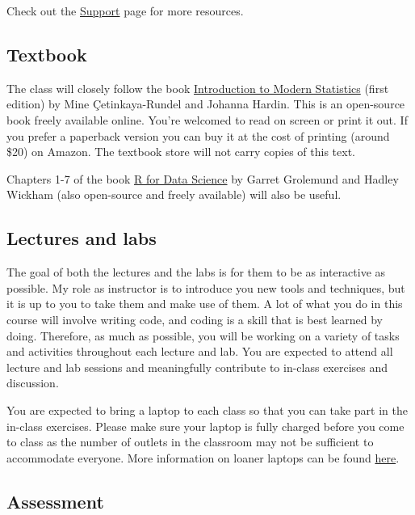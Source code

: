 \documentclass[
  letterpaper,
  DIV=11,
  numbers=noendperiod]{scrartcl}
\begin{document}
Check out the \href{/course-support.html}{Support} page for more
resources.

\hypertarget{textbook}{%
\subsection{Textbook}\label{textbook}}

The class will closely follow the book
\href{https://openintro-ims.netlify.app/}{Introduction to Modern
Statistics} (first edition) by Mine Çetinkaya-Rundel and Johanna Hardin.
This is an open-source book freely available online. You're welcomed to
read on screen or print it out. If you prefer a paperback version you
can buy it at the cost of printing (around \$20) on Amazon. The textbook
store will not carry copies of this text.

Chapters 1-7 of the book \href{https://r4ds.had.co.nz/}{R for Data
Science} by Garret Grolemund and Hadley Wickham (also open-source and
freely available) will also be useful.

\hypertarget{lectures-and-labs}{%
\subsection{Lectures and labs}\label{lectures-and-labs}}

The goal of both the lectures and the labs is for them to be as
interactive as possible. My role as instructor is to introduce you new
tools and techniques, but it is up to you to take them and make use of
them. A lot of what you do in this course will involve writing code, and
coding is a skill that is best learned by doing. Therefore, as much as
possible, you will be working on a variety of tasks and activities
throughout each lecture and lab. You are expected to attend all lecture
and lab sessions and meaningfully contribute to in-class exercises and
discussion.

You are expected to bring a laptop to each class so that you can take
part in the in-class exercises. Please make sure your laptop is fully
charged before you come to class as the number of outlets in the
classroom may not be sufficient to accommodate everyone. More
information on loaner laptops can be found
\href{https://keeplearning.duke.edu/technical-support/}{here}.

\hypertarget{assessment}{%
\subsection{Assessment}\label{assessment}}
\end{document}
